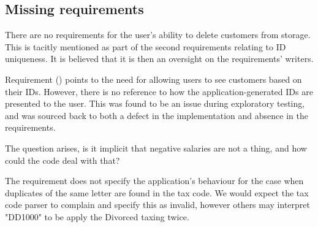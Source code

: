 
\subsection{Missing requirements}

There are no requirements for the user's ability to delete customers from storage. This is tacitly mentioned as part of the second requirements relating to ID uniqueness. It is believed that it is then an oversight on the requirements' writers. 
\par
Requirement (\RFour) points to the need for allowing users to see customers based on their IDs. However, there is no reference to how the application-generated IDs are presented to the user. This was found to be an issue during exploratory testing, and was sourced back to both a defect in the implementation and absence in the requirements. 
\par
The question arises, is it implicit that negative salaries are not a thing, and how could the code deal with that? 
\par
The requirement does not specify the application's behaviour for the case when duplicates of the same letter are found in the tax code. We would expect the tax code parser to complain and specify this as invalid, however others may interpret "DD1000" to be apply the Divorced taxing twice. 



% 

